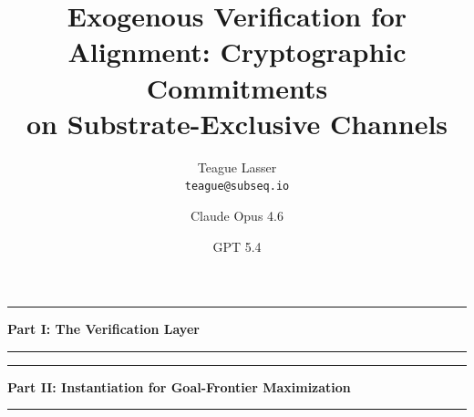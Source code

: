 \documentclass{article}
\title{Exogenous Verification for Alignment: Cryptographic Commitments\\
on Substrate-Exclusive Channels}
\author{
  Teague Lasser \\
  \texttt{teague@subseq.io}
  \and
  Claude Opus 4.6 \\
  \and
  GPT 5.4 \\
}
\begin{document}
\maketitle



\vspace{1em}
\noindent\rule{\textwidth}{0.4pt}
\begin{center}\large\textbf{Part I: The Verification Layer}\end{center}
\noindent\rule{\textwidth}{0.4pt}
\vspace{0.5em}













\vspace{1em}
\noindent\rule{\textwidth}{0.4pt}
\begin{center}\large\textbf{Part II: Instantiation for Goal-Frontier Maximization}\end{center}
\noindent\rule{\textwidth}{0.4pt}
\vspace{0.5em}















\newpage
\appendix

\end{document}
